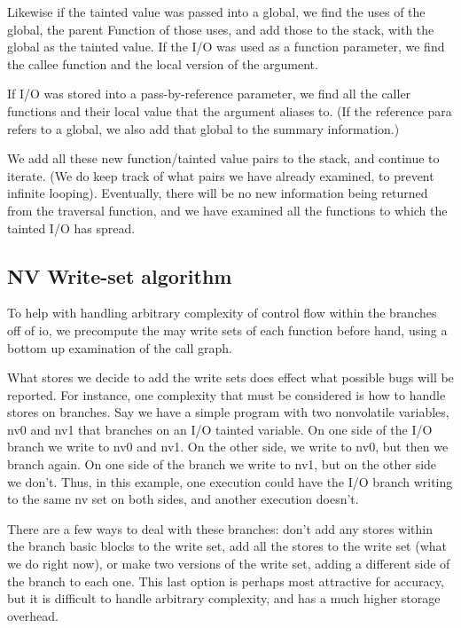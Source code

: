 Likewise if the tainted value was passed into a global, we find the uses of the global, the parent Function of those uses, and add those to the stack, with the global as the tainted value. If the I/O was used as a function parameter, we find the callee function and the local version of the argument. 
	
If I/O was stored into a pass-by-reference parameter, we find all the caller functions and their local value that the argument aliases to. (If the reference para refers to a global, we also add that global to the summary information.)
	
We add all these new function/tainted value pairs to the stack, and continue to iterate. (We do keep track of what pairs we have already examined, to prevent infinite looping). Eventually, there will be no new information being returned from the traversal function, and we have examined all the functions to which the tainted I/O has spread. 
	
\subsection{NV Write-set algorithm}

To help with handling arbitrary complexity of control flow within the branches off of io, we precompute the may write sets of each function before hand, using a bottom up examination of the call graph. 
	
What stores we decide to add the write sets does effect what possible bugs will be reported. For instance, one complexity that must be considered is how to handle stores on branches. Say we have a simple program with two nonvolatile variables, nv0 and nv1 that branches on an I/O tainted variable. On one side of the I/O branch we write to nv0 and nv1. On the other side, we write to nv0, but then we branch again. On one side of the branch we write to nv1, but on the other side we don't. Thus, in this example, one execution could have the I/O branch writing to the same nv set on both sides, and another execution doesn't.
	
There are a few ways to deal with these branches: don't add any stores within the branch basic blocks to the write set, add all the stores to the write set (what we do right now), or make two versions of the write set, adding a different side of the branch to each one. This last option is perhaps most attractive for accuracy, but it is difficult to handle arbitrary complexity, and has a much higher storage overhead.
	
